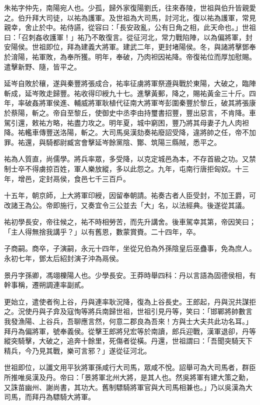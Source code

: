 
\begin{pinyinscope}
朱祐字仲先，南陽宛人也。少孤，歸外家復陽劉氏，往來舂陵，世祖與伯升皆親愛之。伯升拜大司徒，以祐為護軍。及世祖為大司馬，討河北，復以祐為護軍，常見親幸，舍止於中。祐侍讌，從容曰：「長安政亂，公有日角之相，此天命也。」世祖曰：「召刺姦收護軍！」祐乃不敢復言。從征河北，常力戰陷陣，以為偏將軍，封安陽侯。世祖即位，拜為建義大將軍。建武二年，更封堵陽侯。冬，與諸將擊鄧奉於淯陽，祐軍敗，為奉所獲。明年，奉破，乃肉袒因祐降。帝復祐位而厚加慰賜。遣擊新野、隨，皆平之。

延岑自敗於穰，遂與秦豐將張成合，祐率征虜將軍祭遵與戰於東陽，大破之，臨陣斬成，延岑敗走歸豐。祐收得印綬九十七。進擊黃郵，降之，賜祐黃金三十斤。四年，率破姦將軍侯進、輔威將軍耿植代征南大將軍岑彭圍秦豐於黎丘，破其將張康於蔡陽，斬之。帝自至黎丘，使御史中丞李由持璽書招豐，豐出惡言，不肯降。車駕引還，敕祐方略，祐盡力攻之。明年夏，城中窮困，豐乃將其母妻子九人肉袒降。祐轞車傳豐送洛陽，斬之。大司馬吳漢劾奏祐廢詔受降，違將帥之任，帝不加罪。祐還，與騎都尉臧宮會擊延岑餘黨陰、酇、筑陽三縣賊，悉平之。

祐為人質直，尚儒學。將兵率眾，多受降，以克定城邑為本，不存首級之功。又禁制士卒不得虜掠百姓，軍人樂放縱，多以此怨之。九年，屯南行唐拒匈奴。十三年，增邑，定封鬲侯，食邑七千三百戶。

十五年，朝京師，上大將軍印綬，因留奉朝請。祐奏古者人臣受封，不加王爵，可改諸王為公。帝即施行，又奏宜令三公並去「大」名，以法經典。後遂從其議。

祐初學長安，帝往候之，祐不時相勞苦，而先升講舍。後車駕幸其第，帝因笑曰；「主人得無捨我講乎？」以有舊恩，數蒙賞賚。二十四年，卒。

子商嗣。商卒，子演嗣，永元十四年，坐從兄伯為外孫陰皇后巫蠱事，免為庶人。永初七年，鄧太后紹封演子沖為鬲侯。

景丹字孫卿，馮翊櫟陽人也。少學長安。王莽時舉四科：丹以言語為固德侯相，有幹事稱，遷朔調連率副貳。

更始立，遣使者徇上谷，丹與連率耿況降，復為上谷長史。王郎起，丹與況共謀拒之。況使丹與子弇及寇恂等將兵南歸世祖，世祖引見丹等，笑曰：「邯鄲將帥數言我發漁陽、上谷兵，吾聊應言然，何意二郡良為吾來！方與士大夫共此功名耳。」拜丹為偏將軍，號奉義侯。從擊王郎將兒宏等於南讀，郎兵迎戰，漢軍退卻，丹等縱突騎擊，大破之，追奔十餘里，死傷者從橫。丹還，世祖謂曰：「吾聞突騎天下精兵，今乃見其戰，樂可言邪？」遂從征河北。

世祖即位，以讖文用平狄將軍孫咸行大司馬，眾咸不悅。詔舉可為大司馬者，群臣所推唯吳漢及丹。帝曰：「景將軍北州大將，是其人也。然吳將軍有建大策之勳，又誅苗幽州、謝尚書，其功大。舊制驃騎將軍官與大司馬相兼也。」乃以吳漢為大司馬，而拜丹為驃騎大將軍。


\end{pinyinscope}
